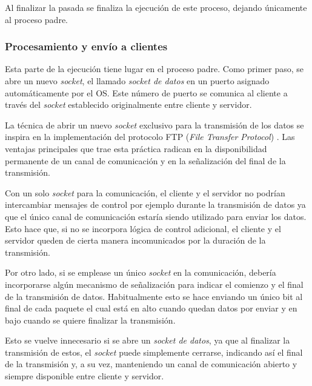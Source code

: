 \documentclass[../../main.tex]{subfiles}
\begin{document}

Al finalizar la pasada se finaliza la ejecución de este proceso, dejando únicamente al proceso padre. 

\subsubsection{Procesamiento y envío a clientes}
Esta parte de la ejecución tiene lugar en el proceso padre. Como primer paso, se abre un nuevo \textit{socket}, el llamado \textit{socket de datos} en un puerto asignado automáticamente por el OS. Este número de puerto se comunica al cliente a través del \textit{socket} establecido originalmente entre cliente y servidor.

La técnica de abrir un nuevo \textit{socket} exclusivo para la transmisión de los datos se inspira en la implementación del protocolo FTP (\textit{File Transfer Protocol}) . Las ventajas principales que trae esta práctica radican en la disponibilidad permanente de un canal de comunicación y en la señalización del final de la transmisión.

Con un solo \textit{socket} para la comunicación, el cliente y el servidor no podrían intercambiar mensajes de control por ejemplo durante la transmisión de datos ya que el único canal de comunicación estaría siendo utilizado para enviar los datos. Esto hace que, si no se incorpora lógica de control adicional, el cliente y el servidor queden de cierta manera incomunicados por la duración de la transmisión.

Por otro lado, si se emplease un único \textit{socket} en la comunicación, debería incorporarse algún mecanismo de señalización para indicar el comienzo y el final de la transmisión de datos. Habitualmente esto se hace enviando un único bit al final de cada paquete el cual está en alto cuando quedan datos por enviar y en bajo cuando se quiere finalizar la transmisión. 

Esto se vuelve innecesario si se abre un \textit{socket de datos}, ya que al finalizar la transmisión de estos, el \textit{socket} puede simplemente cerrarse, indicando así el final de la transmisión y, a su vez, manteniendo un canal de comunicación abierto y siempre disponible entre cliente y servidor.
\end{document}
